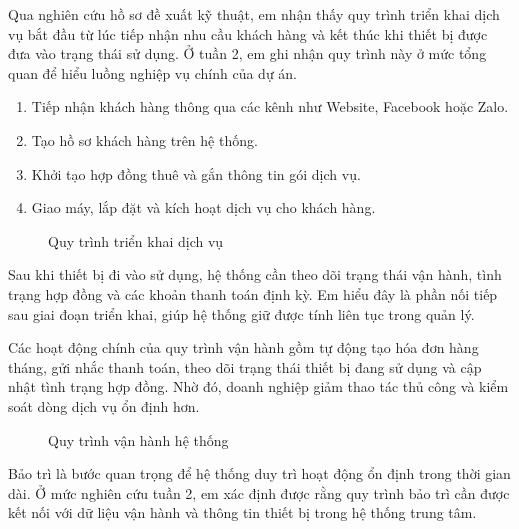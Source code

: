 
Qua nghiên cứu hồ sơ đề xuất kỹ thuật, em nhận thấy quy trình triển khai dịch vụ bắt đầu từ lúc tiếp nhận nhu cầu khách hàng và kết thúc khi thiết bị được đưa vào trạng thái sử dụng. Ở tuần 2, em ghi nhận quy trình này ở mức tổng quan để hiểu luồng nghiệp vụ chính của dự án.

\begin{enumerate}
    \item Tiếp nhận khách hàng thông qua các kênh như Website, Facebook hoặc Zalo.
    \item Tạo hồ sơ khách hàng trên hệ thống.
    \item Khởi tạo hợp đồng thuê và gắn thông tin gói dịch vụ.
    \item Giao máy, lắp đặt và kích hoạt dịch vụ cho khách hàng.
\end{enumerate}

\begin{figure}[H]
    \centering
    \caption{Quy trình triển khai dịch vụ}
    \label{fig:service_process}
\end{figure}


Sau khi thiết bị đi vào sử dụng, hệ thống cần theo dõi trạng thái vận hành, tình trạng hợp đồng và các khoản thanh toán định kỳ. Em hiểu đây là phần nối tiếp sau giai đoạn triển khai, giúp hệ thống giữ được tính liên tục trong quản lý.

Các hoạt động chính của quy trình vận hành gồm tự động tạo hóa đơn hàng tháng, gửi nhắc thanh toán, theo dõi trạng thái thiết bị đang sử dụng và cập nhật tình trạng hợp đồng. Nhờ đó, doanh nghiệp giảm thao tác thủ công và kiểm soát dòng dịch vụ ổn định hơn.

\begin{figure}[H]
    \centering
    \caption{Quy trình vận hành hệ thống}
    \label{fig:operation_process}
\end{figure}


Bảo trì là bước quan trọng để hệ thống duy trì hoạt động ổn định trong thời gian dài. Ở mức nghiên cứu tuần 2, em xác định được rằng quy trình bảo trì cần được kết nối với dữ liệu vận hành và thông tin thiết bị trong hệ thống trung tâm.


